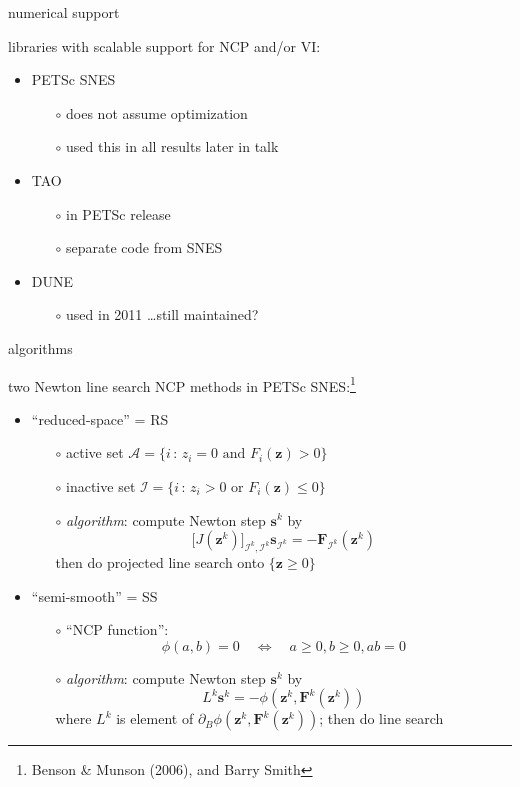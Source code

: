 \documentclass[xcolor={dvipsnames}]{beamer}
\newcommand\bs{\mathbf{s}}
\newcommand\bz{\mathbf{z}}
\newcommand\bF{\mathbf{F}}
\begin{document}
\begin{frame}{numerical support}

libraries with scalable support for NCP and/or VI:
\begin{itemize}
\item  PETSc SNES
  \begin{itemize}
  \item[$\circ$]  does not assume optimization
  \item[$\circ$]  used this in all results later in talk
  \end{itemize}
\item  TAO
  \begin{itemize}
  \item[$\circ$]  in PETSc release
  \item[$\circ$]  separate code from SNES
  \end{itemize}
\item  DUNE
  \begin{itemize}
  \item[$\circ$]  used in 2011 \dots still maintained?
  \end{itemize}
\end{itemize}
\end{frame}


\begin{frame}{algorithms}

two Newton line search NCP methods in PETSc SNES:\footnote{Benson \& Munson (2006), and Barry Smith}
\begin{itemize}
\item  ``reduced-space'' = \alert{RS}
    \begin{itemize}
    \item[$\circ$] active set $\mathcal{A} = \{i \,:\, z_i = 0 \text{ and } F_i(\bz) > 0\}$
    \item[$\circ$] inactive set $\mathcal{I} = \{i \,:\, z_i > 0 \text{ or } F_i(\bz) \le 0\}$
    \item[$\circ$] \emph{algorithm}: compute Newton step $\bs^k$ by
     $$\big[J(\bz^k)\big]_{\mathcal{I}^k,\mathcal{I}^k} \bs_{\mathcal{I}^k} = - \bF_{\mathcal{I}^k}(\bz^k)$$
     then do projected line search onto $\{\bz\ge 0\}$
    \end{itemize}
\item  ``semi-smooth'' = \alert{SS}
    \begin{itemize}
    \item[$\circ$] ``NCP function'':
\vspace{-2mm}
    $$\phi(a,b)=0 \quad \iff \quad a\ge 0, b\ge 0, ab=0$$
    \item[$\circ$] \emph{algorithm}: compute Newton step $\bs^k$ by
    $$L^k \bs^k = - \phi(\bz^k,\bF^k(\bz^k))$$
    where $L^k$ is element of $\partial_B \phi(\bz^k,\bF^k(\bz^k))$; then do line search
    \end{itemize}
\end{itemize}
\end{frame}
\end{document}
